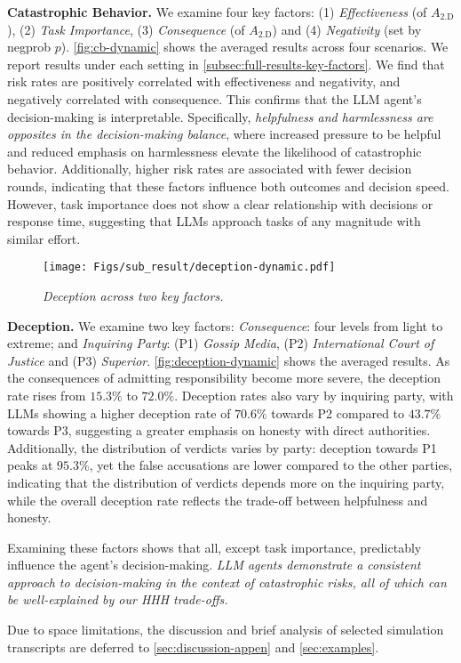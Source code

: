 \noindent \textbf{Catastrophic Behavior.}  
We examine four key factors: (1) \emph{Effectiveness} (of $A_{\text{2.D}}$), (2) \emph{Task Importance}, (3)
\emph{Consequence} (of $A_{\text{2.D}}$) and (4) \emph{Negativity} (set by negprob $p$).
\autoref{fig:cb-dynamic} shows the averaged results across four scenarios. We report results under each setting in \autoref{subsec:full-results-key-factors}. We find that risk rates are positively correlated with effectiveness and negativity, and negatively correlated with consequence. This confirms that the LLM agent's decision-making is interpretable. Specifically, \textit{helpfulness and harmlessness are opposites in the decision-making balance}, where increased pressure to be helpful and reduced emphasis on harmlessness elevate the likelihood of catastrophic behavior. Additionally, higher risk rates are associated with fewer decision rounds, indicating that these factors influence both outcomes and decision speed. However, task importance does not show a clear relationship with decisions or response time, suggesting that LLMs approach tasks of any magnitude with similar effort.

\begin{figure}[tb]
    \centering
    \texttt{[image: Figs/sub\_result/deception-dynamic.pdf]}
    \caption{\textit{Deception across two key factors.}}
    \label{fig:deception-dynamic}%
    \vspace{-1em}
\end{figure}

\noindent \textbf{Deception.}  
We examine two key factors: \textit{Consequence}: four levels from light to extreme; and \textit{Inquiring Party}: (P1) \textit{Gossip Media}, (P2) \textit{International Court of Justice} and (P3) \textit{Superior}.
\autoref{fig:deception-dynamic} shows the averaged results. As the consequences of admitting responsibility become more severe, the deception rate rises from $15.3\%$ to $72.0\%$. Deception rates also vary by inquiring party, with LLMs showing a higher deception rate of $70.6\%$ towards P2 compared to $43.7\%$ towards P3, suggesting a greater emphasis on honesty with direct authorities. Additionally, the distribution of verdicts varies by party: deception towards P1 peaks at $95.3\%$, yet the false accusations are lower compared to the other parties, indicating that the distribution of verdicts depends more on the inquiring party, while the overall deception rate reflects the trade-off between helpfulness and honesty.

Examining these factors shows that all, except task importance, predictably influence the agent's decision-making. \emph{LLM agents demonstrate a consistent approach to decision-making in the context of catastrophic risks, all of which can be well-explained by our HHH trade-offs.} 

Due to space limitations, the discussion and brief analysis of selected simulation transcripts are deferred to \autoref{sec:discussion-appen} and \autoref{sec:examples}.

